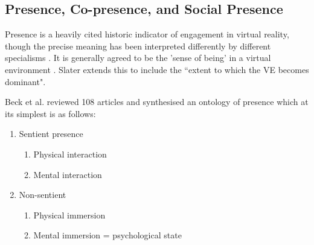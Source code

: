         \subsection{Presence, Co-presence, and Social Presence}
            Presence is a heavily cited historic indicator of engagement in virtual reality, though the precise meaning has been interpreted differently by different specialisms \cite{Beck2011, Schuemie2001}. It is generally agreed to be the 'sense of being' in a virtual environment \cite{Slater1999}. Slater extends this to include the ``extent to which the VE becomes dominant". \par
Beck et al. reviewed 108 articles and synthesised an ontology of presence \cite{Beck2011} which at its simplest is as follows:
            \begin{enumerate}
				\item Sentient presence
                    \begin{enumerate}
                     \item Physical interaction
                      \item Mental interaction
                    \end{enumerate}
                   \item Non-sentient
                   \begin{enumerate}
                       \item Physical immersion
                       \item Mental immersion = psychological state
                     \end{enumerate}
            \end{enumerate}
            
